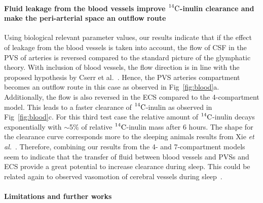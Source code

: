 \documentclass[10pt]{article}
\newcommand{\etal}{\emph{et al.}\;}
\newcommand{\1}{^{(1)}}
\newcommand{\2}{^{(2)}}
\newcommand{\Cinulin}{$\prescript{14}{}{\text{C}}$-inulin }
\begin{document}
\paragraph{Fluid leakage from the blood vessels improve \Cinulin clearance and make the peri-arterial space an outflow route}
Using biological relevant parameter values, our results indicate that if the effect of leakage from the blood vessels is taken into account, the flow of CSF in the PVS of arteries is reversed compared to the standard picture of the glymphatic theory. With inclusion of blood vessels, the flow direction is in line with the proposed hypothesis by Cserr et al.~\cite{cserr1992drainage}. Hence, the PVS arteries compartment becomes an outflow route in this case as observed in Fig~\ref{fig:blood}a. Additionally, the flow is also reversed in the ECS compared to the 4-compartment model. This leads to a faster clearance of \Cinulin as observed in Fig~\ref{fig:blood}c. For this third test case the relative amount of \Cinulin decays exponentially with $\sim$5\% of relative \Cinulin mass after 6 hours. The shape for the clearance curve corresponds more to the sleeping animals results from Xie \etal~\cite{Xie_2013_sleep}. Therefore, combining our results from the 4- and 7-compartment models seem to indicate that the transfer of fluid between blood vessels and PVSs and ECS provide a great potential to increase clearance during sleep. This could be related again to observed vasomotion of cerebral vessels during sleep~\cite{Bojarskaite2022}. 


\paragraph{Limitations and further works}
\end{document}
